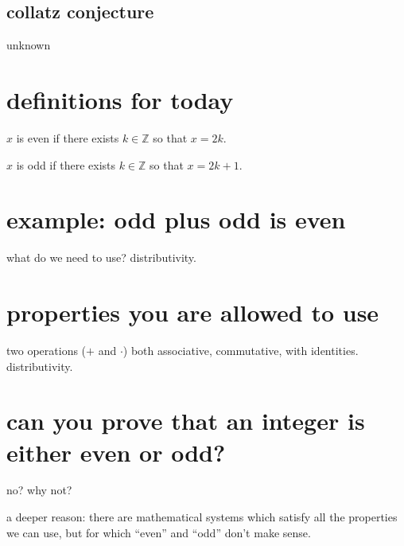 \documentclass[12pt]{handout}
\begin{document}
\subsection*{collatz conjecture}

unknown

\section*{definitions for today}

$x$ is even if there exists $k \in \mathbb{Z}$ so that $x = 2k$.

$x$ is odd if there exists $k \in \mathbb{Z}$ so that $x = 2k+1$.

\section*{example: odd plus odd is even}

what do we need to use?  distributivity.

\section*{properties you are allowed to use}

two operations ($+$ and $\cdot$) both associative, commutative, with
identities.  distributivity.

\section*{can you prove that an integer is either even or odd?}

no?  why not?

a deeper reason: there are mathematical systems which satisfy all the
properties we can use, but for which ``even'' and ``odd'' don't make
sense.
\end{document}
